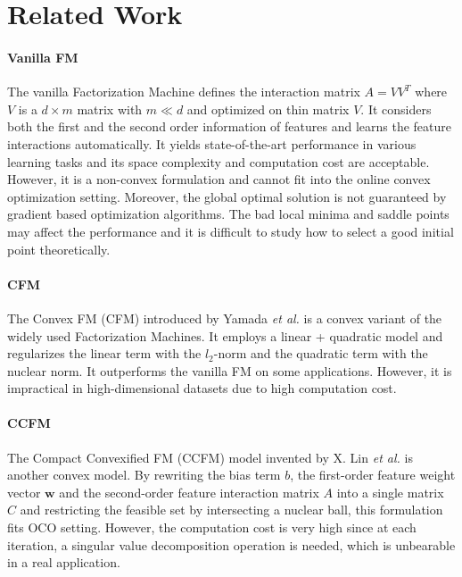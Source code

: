 \documentclass[letterpaper]{article} %
\theoremstyle{plain}
\theoremstyle{definition}
\begin{document}
\section{Related Work}\label{related_sec}

\paragraph{Vanilla FM}
The vanilla Factorization Machine \cite{RendleICDM} defines the interaction matrix $A = V V^T$ where $V$ is a $d\times m$ matrix with $m \ll d$ and optimized on thin matrix $V$. It considers both the first and the second order information of features and learns the feature interactions automatically. It yields state-of-the-art performance in various learning tasks and its space complexity and computation cost are acceptable. However, it is a non-convex formulation and cannot fit into the online convex optimization setting. Moreover, the global optimal solution is not guaranteed by gradient based optimization algorithms. The bad local minima and saddle points may affect the performance and it is difficult to study how to select a good initial point theoretically.

\paragraph{CFM}
The Convex FM (CFM) introduced by Yamada \textit{et al.} \cite{YamadaKDD} is a convex variant of the widely used Factorization Machines. It employs a linear + quadratic model and regularizes the linear term with the $l_2$-norm and the quadratic term with the nuclear norm. It outperforms the vanilla FM on some applications. However, it is impractical in high-dimensional datasets due to high computation cost.

\paragraph{CCFM}
The Compact Convexified FM (CCFM) model invented by X. Lin \textit{et al.} \cite{LinWWW} is another convex model. By rewriting the bias term $b$, the first-order feature weight vector $\mathbf{w}$ and the second-order feature interaction matrix $A$ into a single matrix $C$ and restricting the feasible set by intersecting a nuclear ball, this formulation fits OCO setting. However, the computation cost is very high since at each iteration, a singular value decomposition operation is needed, which is unbearable in a real application.
\end{document}
